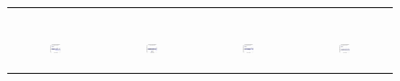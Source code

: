 \begin{figure}[ht]
\begin{tabular}{cccc}
\begin{subfigure}[b]{0.22\textwidth}
			\caption{}
			\label{appfig:partition:speedup_it2004_setcover}
	  \end{subfigure} \\
	  \begin{subfigure}[b]{0.22\textwidth}
	  	\includegraphics[width=110pt]{images_partition/diffFA_CF2G_friendster_setcover.eps}
			\caption{}
			\label{appfig:partition:diffFA_CF2G_friendster_setcover}
	  \end{subfigure} &
	  \begin{subfigure}[b]{0.22\textwidth}
	  	\includegraphics[width=110pt]{images_partition/diffFA_CF2G_arabic2005_setcover.eps}
			\caption{}
			\label{appfig:partition:diffFA_CF2G_arabic2005_setcover}
	  \end{subfigure} &
	  \begin{subfigure}[b]{0.22\textwidth}
	  	\includegraphics[width=110pt]{images_partition/diffFA_CF2G_uk2005_setcover.eps}
			\caption{}
			\label{appfig:partition:diffFA_CF2G_uk2005_setcover}
	  \end{subfigure} &
	  \begin{subfigure}[b]{0.22\textwidth}
	  	\includegraphics[width=110pt]{images_partition/diffFA_CF2G_it2004_setcover.eps}

\end{subfigure}
\end{tabular}
\end{figure}
